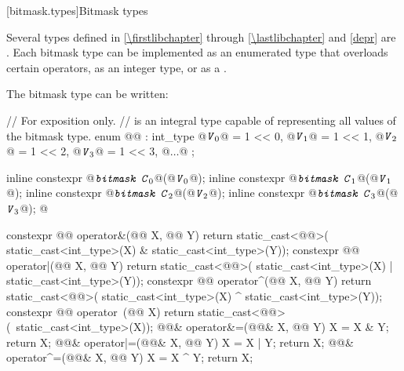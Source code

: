 [bitmask.types]{Bitmask types}

\pnum
Several types defined in \ref{\firstlibchapter} through \ref{\lastlibchapter}
and \ref{depr} are
.
Each bitmask type can be implemented as an
enumerated type that overloads certain operators, as an integer type,
or as a
.
%

\pnum
The bitmask type  can be written:

\begin{codeblock}
// For exposition only.
//  is an integral type capable of representing all values of the bitmask type.
enum @@ : int_type {
  @$\texttt{\textit{V}}_{0}$@ = 1 << 0, @$\texttt{\textit{V}}_{1}$@ = 1 << 1, @$\texttt{\textit{V}}_{2}$@ = 1 << 2, @$\texttt{\textit{V}}_{3}$@ = 1 << 3, @$\ldots$@
};

inline constexpr @$\texttt{\textit{bitmask C}}_{0}$@(@$\texttt{\textit{V}}_{0}{}$@);
inline constexpr @$\texttt{\textit{bitmask C}}_{1}$@(@$\texttt{\textit{V}}_{1}{}$@);
inline constexpr @$\texttt{\textit{bitmask C}}_{2}$@(@$\texttt{\textit{V}}_{2}{}$@);
inline constexpr @$\texttt{\textit{bitmask C}}_{3}$@(@$\texttt{\textit{V}}_{3}{}$@);
  @\vdots@

constexpr @@ operator&(@@ X, @@ Y) {
  return static_cast<@@>(
    static_cast<int_type>(X) & static_cast<int_type>(Y));
}
constexpr @@ operator|(@@ X, @@ Y) {
  return static_cast<@@>(
    static_cast<int_type>(X) | static_cast<int_type>(Y));
}
constexpr @@ operator^(@@ X, @@ Y){
  return static_cast<@@>(
    static_cast<int_type>(X) ^ static_cast<int_type>(Y));
}
constexpr @@ operator~(@@ X){
  return static_cast<@@>(~static_cast<int_type>(X));
}
@@& operator&=(@@& X, @@ Y){
  X = X & Y; return X;
}
@@& operator|=(@@& X, @@ Y) {
  X = X | Y; return X;
}
@@& operator^=(@@& X, @@ Y) {
  X = X ^ Y; return X;
}
\end{codeblock}

